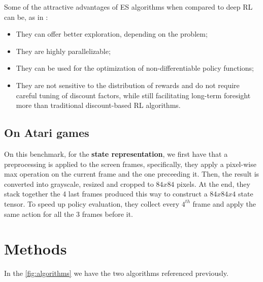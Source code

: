 \documentclass[10pt]{article} %
\begin{document}
Some of the attractive advantages of ES algorithms when compared to deep RL can be, as in \cite{DBLP:journals/corr/abs-1802-08842}:

\begin{itemize}
    \item They can offer better exploration, depending on the problem;
    \item They are highly parallelizable;
    \item They can be used for the optimization of non-differentiable policy functions;
    \item They are not sensitive to the distribution of rewards and do not require careful tuning of discount factors, while still facilitating long-term foresight more than traditional discount-based RL algorithms.
\end{itemize}

\subsection{On Atari games}

On this benchmark, for the \textbf{state representation}, we first have that a preprocessing is applied to the screen frames, specifically, they apply a pixel-wise max operation on the current frame and the one preceeding it. Then, the result is converted into grayscale, resized and cropped to $84x84$ pixels. At the end, they stack together the 4 last frames produced this way to construct a $84x84x4$ state tensor. To speed up policy evaluation, they collect every $4^{th}$ frame and apply the same action for all the $3$ frames before it.

\section{Methods}

In the \cref{fig:algorithms} we have the two algorithms referenced previously.
\end{document}
